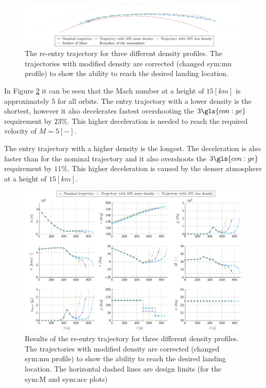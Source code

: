 \begin{figure}[h]
	\centering
	\includegraphics[width=0.99\textwidth]{Figure/Orbit/entry_mars.pdf}
	\caption[The re-entry trajectory for three different density profiles]{The re-entry trajectory for three different density profiles. The trajectories with modified density are corrected (changed \gls{sym:mu} profile) to show the ability to reach the desired landing location.}
	\label{fig:entry_mars}
\end{figure}

In Figure \ref{fig:orbit_entry_data} it can be seen that the Mach number at a height of $15 \left[km\right]$ is approximately $5$ for all orbits. The entry trajectory with a lower density is the shortest, however it also decelerates fastest overshooting the $3\gls{con:ge}$ requirement by $23\%$. This higher deceleration is needed to reach the required velocity of $M=5 \left[-\right]$.

The entry trajectory with a higher density is the longest. The deceleration is also faster than for the nominal trajectory and it also overshoots the $3\gls{con:ge}$ requirement by $11\%$. This higher deceleration is caused by the denser atmosphere at a height of $15 \left[km\right]$.

\begin{figure}
	\centering
	\includegraphics[width=0.99\textwidth]{Figure/Orbit/sensitivity_entry.pdf}
	\caption[Results of the re-entry trajectory for three different density profiles]{Results of the re-entry trajectory for three different density profiles. The trajectories with modified density are corrected (changed \gls{sym:mu} profile) to show the ability to reach the desired landing location. The horizontal dashed lines are design limits (for the \gls{sym:M} and \gls{sym:acc} plots)}
	\label{fig:orbit_entry_data}
\end{figure}

